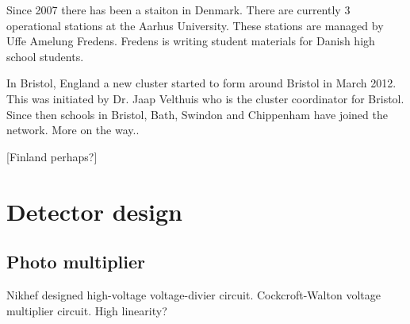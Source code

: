 Since 2007 there has been a \hisparc staiton in
Denmark. There are currently 3 operational stations at the Aarhus
University. These stations are managed by Uffe Amelung Fredens.
Fredens is writing student materials for Danish high school students.

In Bristol, England a new cluster started to form around Bristol in
March 2012. This was initiated by Dr. Jaap Velthuis who is the cluster
coordinator for Bristol. Since then schools in Bristol, Bath, Swindon
and Chippenham have joined the network. More on the way..

[Finland perhaps?]


\section{Detector design}

\subsection{Photo multiplier}

Nikhef designed high-voltage voltage-divier circuit.
Cockcroft-Walton voltage multiplier circuit.
High linearity?
